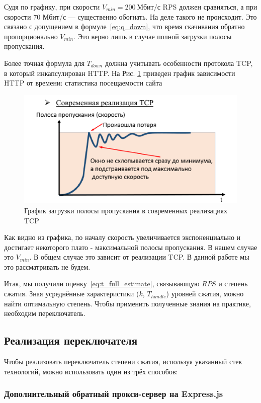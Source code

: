 \documentclass[12pt]{article}
\begin{document}
Судя по графику, при скорости $V_{min} = 200\ \text{Мбит/с}$ RPS должен сравняться, а при скорости 70 Мбит/с — существенно обогнать. На деле такого не происходит.
Это связано с допущением в формуле~\eqref{eq:q_down}, что время скачивания обратно пропорционально $V_{min}$. Это верно лишь в случае полной загрузки полосы пропускания.

Более точная формула для $T_{down}$ должна учитывать особенности протокола TCP,
в который инкапсулирован HTTP. На Рис. \ref{fig:klimanov_tcp}
приведен график зависимости HTTP от времени:
статистика посещаемости сайта
\begin{figure}[H]
    \centering
    \includegraphics[width=1\textwidth]{../images/klimanov_tcp.png}
    \caption{График загрузки полосы пропускания в современных реализациях TCP \cite{klimanov-networks}}
    \label{fig:klimanov_tcp}
\end{figure}

Как видно из графика, по началу скорость увеличивается экспоненциально и достигает некоторого плато - максимальной полосы пропускания.
В нашем случае это $V_{min}$. В общем случае это зависит от реализации TCP. В данной работе мы это рассматривать не будем.

Итак, мы получили оценку~\eqref{eq:t_full_estimate}, связывающую $RPS$ и степень сжатия. Зная усреднённые характеристики ($k$, $T_{handle}$) уровней сжатия,
можно найти оптимальную степень. Чтобы применить полученные знания на практике, необходим переключатель.
\subsection{Реализация переключателя}

Чтобы реализовать переключатель степени сжатия, используя указанный стек технологий, можно использовать один из трёх способов:

\subsubsection{Дополнительный обратный прокси-сервер на Express.js}
\end{document}
